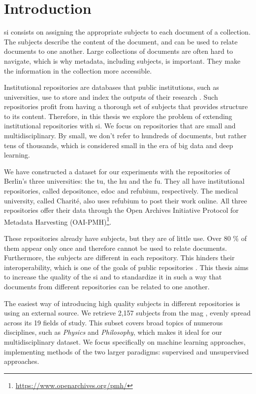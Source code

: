 \section{Introduction}

\acrfull{si} consists on assigning the appropriate subjects to each document of a collection. The subjects describe the content of the document, and can be used to relate documents to one another. Large collections of documents are often hard to navigate, which is why metadata, including subjects, is important. They make the information in the collection more accessible.

Institutional repositories are databases that public institutions, such as universities, use to store and index the outputs of their research \cite{barton2004creating}. Such repositories profit from having a thorough set of subjects that provides structure to its content. Therefore, in this thesis we explore the problem of extending institutional repositories with \acrshort{si}. We focus on repositories that are small and multidisciplinary. By small, we don't refer to hundreds of documents, but rather tens of thousands, which is considered small in the era of big data and deep learning.

We have constructed a dataset for our experiments with the repositories of Berlin's three universities: the \acrfull{tu}, the \acrfull{hu} and the \acrfull{fu}. They all have institutional repositories, called depositonce, edoc and refubium, respectively. The medical university, called Charité, also uses refubium to post their work online. All three repositories offer their data through the Open Archives Initiative Protocol for Metadata Harvesting (OAI-PMH)\footnote{\url{https://www.openarchives.org/pmh/}}.

These repositories already have subjects, but they are of little use. Over 80 \% of them appear only once and therefore cannot be used to relate documents. Furthermore, the subjects are different in each repository. This hinders their interoperability, which is one of the goals of public repositories \cite{barton2004creating}. This thesis aims to increase the quality of the \acrshort{si} and to standardize it in such a way that documents from different repositories can be related to one another.

The easiest way of introducing high quality subjects in different repositories is using an external source. We retrieve 2,157 subjects from the \acrfull{mag} \cite{shen2018web}, evenly spread across its 19 fields of study. This subset covers broad topics of numerous disciplines, such as \textit{Physics} and \textit{Philosophy}, which makes it ideal for our multidisciplinary dataset. We focus specifically on machine learning approaches, implementing methods of the two larger paradigms: supervised and unsupervised approaches.

